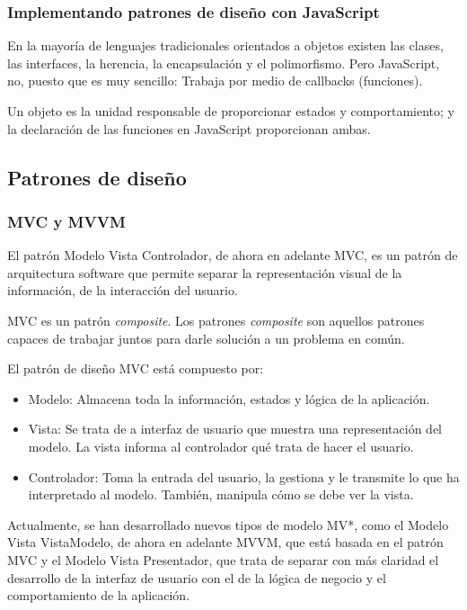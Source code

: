 \subsubsection{Implementando patrones de diseño con JavaScript}
En la mayoría de lenguajes tradicionales orientados a objetos existen las clases, las interfaces, la herencia, la encapsulación y el polimorfismo. Pero JavaScript, no, puesto que es muy sencillo: Trabaja por medio de callbacks (funciones).


Un objeto es la unidad responsable de proporcionar estados y comportamiento; y la declaración de las funciones en JavaScript proporcionan ambas\cite{angular_embraced}.


\subsection{Patrones de diseño}
\subsubsection{MVC y MVVM}
El patrón Modelo Vista Controlador, de ahora en adelante MVC, es un patrón de arquitectura software que permite separar la representación visual de la información, de la interacción del usuario. 


MVC es un patrón \textit{composite}. Los patrones \textit{composite} son aquellos patrones capaces de trabajar juntos para darle solución a un problema en común\cite{ericfreemanelisabethfreemankathysierrabertbates2004}. 


El patrón de diseño MVC está compuesto por:


\begin{itemize}
\item Modelo: Almacena toda la información, estados y lógica de la aplicación.
\item Vista: Se trata de a interfaz de usuario que muestra una representación del modelo. La vista informa al controlador qué trata de hacer el usuario. 
\item Controlador: Toma la entrada del usuario, la gestiona y le transmite lo que ha interpretado al modelo. También, manipula cómo se debe ver la vista.
\end{itemize}


Actualmente, se han desarrollado nuevos tipos de modelo MV*, como el Modelo Vista VistaModelo, de ahora en adelante MVVM, que está basada en el patrón MVC y el Modelo Vista Presentador, que trata de separar con más claridad el desarrollo de la interfaz de usuario con el de la lógica de negocio y el comportamiento de la aplicación.


